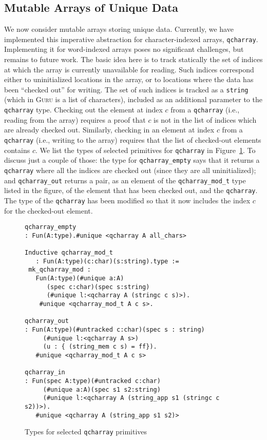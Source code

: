 \documentclass[9pt,natbib]{sigplanconf}
\begin{document}
\subsection{Mutable Arrays of Unique Data}

We now consider mutable arrays storing unique data.  Currently, we
have implemented this imperative abstraction for character-indexed
arrays, \texttt{qcharray}.  Implementing it for word-indexed arrays
poses no significant challenges, but remains to future work.  The
basic idea here is to track statically the set of indices at which the
array is currently unavailable for reading.  Such indices correspond
either to uninitialized locations in the array, or to locations where
the data has been ``checked out'' for writing.  The set of such
indices is tracked as a \texttt{string} (which in \textsc{Guru} is a
list of characters), included as an additional parameter to the
\texttt{qcharray} type. Checking out the element at index $c$ from a
\texttt{qcharray} (i.e., reading from the array) requires a proof that
$c$ is not in the list of indices which are already checked out.
Similarly, checking in an element at index $c$ from a
\texttt{qcharray} (i.e., writing to the array) requires that the list
of checked-out elements contains $c$.  We list the types of selected
primitives for \texttt{qcharray} in Figure~\ref{fig:qcharray}.  To
discuss just a couple of those: the type for \texttt{qcharray\_empty}
says that it returns a \texttt{qcharray} where all the indices are
checked out (since they are all uninitialized); and
\texttt{qcharray\_out} returns a pair, as an element of the
\texttt{qcharray\_mod\_t} type listed in the figure, of the element
that has been checked out, and the \texttt{qcharray}.  The type of the
\texttt{qcharray} has been modified so that it now includes the index
$c$ for the checked-out element.

\begin{figure}
\small
\begin{verbatim}
qcharray_empty 
: Fun(A:type).#unique <qcharray A all_chars>

Inductive qcharray_mod_t
   : Fun(A:type)(c:char)(s:string).type :=
 mk_qcharray_mod : 
   Fun(A:type)(#unique a:A)
      (spec c:char)(spec s:string)
      (#unique l:<qcharray A (stringc c s)>).
    #unique <qcharray_mod_t A c s>.

qcharray_out 
: Fun(A:type)(#untracked c:char)(spec s : string)
     (#unique l:<qcharray A s>)
     (u : { (string_mem c s) = ff}).
   #unique <qcharray_mod_t A c s>

qcharray_in
: Fun(spec A:type)(#untracked c:char)
     (#unique a:A)(spec s1 s2:string)
     (#unique l:<qcharray A (string_app s1 (stringc c s2))>). 
   #unique <qcharray A (string_app s1 s2)>
\end{verbatim}
\label{fig:qcharray}
\caption{Types for selected \texttt{qcharray} primitives}
\end{figure}
\end{document}
